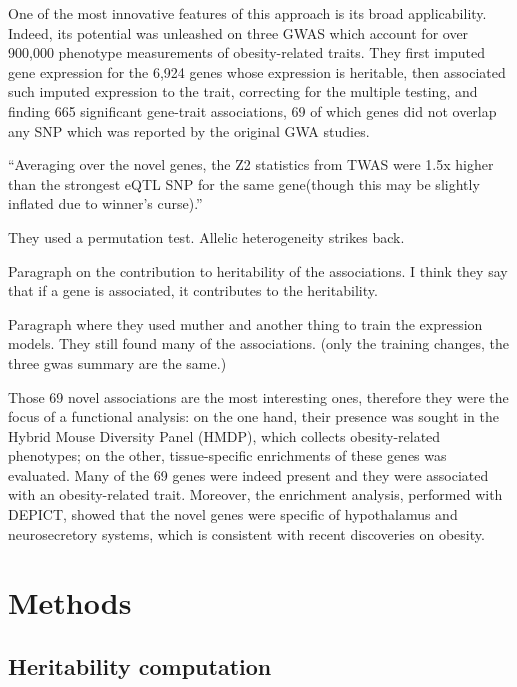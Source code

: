\documentclass[../main.tex]{subfiles}
\begin{document}
One of the most innovative features of this approach is its broad 
applicability. Indeed, its potential was unleashed on three GWAS which 
account for over 900,000 phenotype measurements of obesity-related 
traits. They first 
imputed gene expression for the 6,924 genes whose expression is 
heritable, then associated such imputed expression to the trait, 
correcting for the multiple testing, and finding 665 significant 
gene-trait associations, 69 of which genes did not overlap any SNP which 
was reported by the original GWA studies.

\enquote{Averaging over the novel genes, the Z2 statistics from TWAS 
were 1.5x higher than the strongest eQTL SNP for the same gene(though 
this may be slightly inflated due to winner’s curse).}

They used a permutation test. Allelic heterogeneity strikes back.

Paragraph on the contribution to heritability of the associations. I 
think they say that if a gene is associated, it contributes to the 
heritability.

Paragraph where they used muther and another thing to train the 
expression models. They still found many of the associations. (only the 
training changes, the three gwas summary are the same.)

Those 69 novel associations are the most interesting ones, therefore 
they were the focus of a functional analysis: on the one hand, their 
presence was sought in the Hybrid Mouse Diversity Panel (HMDP), which 
collects obesity-related phenotypes; on the other, tissue-specific 
enrichments of these genes was evaluated. Many of the 69 genes were 
indeed present and they were associated with an obesity-related trait. 
Moreover, the enrichment analysis, performed with DEPICT, showed that 
the novel genes were specific of hypothalamus and neurosecretory 
systems, which is consistent with recent discoveries on 
obesity.

\section{Methods}

\subsection{Heritability computation}
\end{document}
